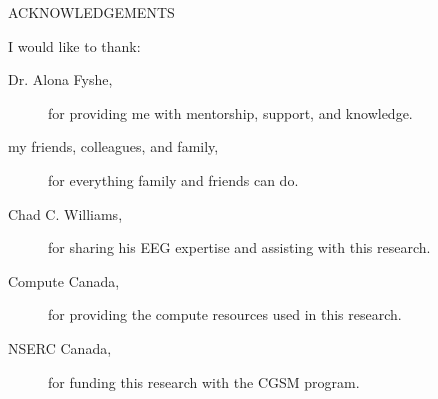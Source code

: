 \newpage
{}

\begin{center}
ACKNOWLEDGEMENTS
\end{center}

\noindent I would like to thank:
\begin{description}
\item[Dr. Alona Fyshe,]
	for providing me with mentorship, support, and knowledge.
\item[my friends, colleagues, and family,]
	for everything family and friends can do.
\item[Chad C. Williams,]
	for sharing his EEG expertise and assisting with this research.
\item[Compute Canada,]
	for providing the compute resources used in this research.
\item[NSERC Canada,]
	for funding this research with the CGSM program.
\end{description}

